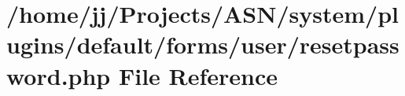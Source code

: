 \hypertarget{system_2plugins_2default_2forms_2user_2resetpassword_8php}{}\section{/home/jj/\+Projects/\+A\+S\+N/system/plugins/default/forms/user/resetpassword.php File Reference}
\label{system_2plugins_2default_2forms_2user_2resetpassword_8php}
